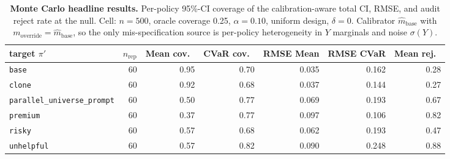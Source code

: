 \begin{table}[h]
\centering\small
\caption{\textbf{Monte Carlo headline results.} Per-policy 95\%-CI coverage of the calibration-aware total CI, RMSE, and audit reject rate at the null. Cell: $n{=}500$, oracle coverage 0.25, $\alpha{=}0.10$, uniform design, $\delta{=}0$. Calibrator $\hat m_{\text{base}}$ with $m_{\text{override}}{=}\hat m_{\text{base}}$, so the only mis-specification source is per-policy heterogeneity in $Y$ marginals and noise $\sigma(Y)$.}
\label{tab:mc-validation-headline}
\begin{tabular}{lrrrrrr}
\toprule
target $\pi'$ & $n_{\text{rep}}$ & Mean cov.\ & CVaR cov.\ & RMSE Mean & RMSE CVaR & Mean rej.\ \\
\midrule
\texttt{base} & 60 & 0.95 & 0.70 & 0.035 & 0.162 & 0.28 \\
\texttt{clone} & 60 & 0.92 & 0.68 & 0.037 & 0.144 & 0.27 \\
\texttt{parallel\_universe\_prompt} & 60 & 0.50 & 0.77 & 0.069 & 0.193 & 0.67 \\
\texttt{premium} & 60 & 0.37 & 0.77 & 0.097 & 0.106 & 0.82 \\
\texttt{risky} & 60 & 0.57 & 0.68 & 0.062 & 0.193 & 0.47 \\
\texttt{unhelpful} & 60 & 0.57 & 0.82 & 0.090 & 0.248 & 0.88 \\
\bottomrule
\end{tabular}
\end{table}
